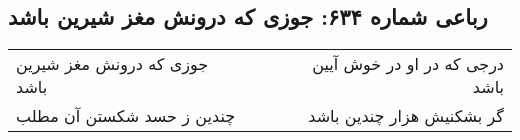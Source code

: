 \begin{center}
\section*{رباعی شماره ۶۳۴: جوزی که درونش مغز شیرین باشد}
\label{sec:0634}
\begin{longtable}{l p{0.5cm} r}
جوزی که درونش مغز شیرین باشد
&&
درجی که در او در خوش آیین باشد
\\
چندین ز حسد شکستن آن مطلب
&&
گر بشکنیش هزار چندین باشد
\\
\end{longtable}
\end{center}
